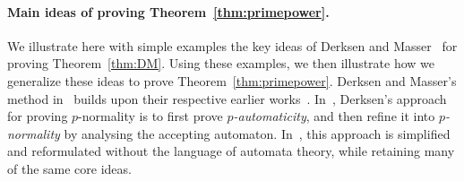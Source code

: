 \documentclass[letterpaper, 11pt, thm-restate]{article}
\numberwithin{equation}{section}
\theoremstyle{definition}
\theoremstyle{definition}
\theoremstyle{definition}
\begin{document}
\paragraph*{Main ideas of proving Theorem~\ref{thm:primepower}.}
We illustrate here with simple examples the key ideas of Derksen and Masser~\cite{derksen2012linear} %
for proving Theorem~\ref{thm:DM}.
Using these examples, we then illustrate how we generalize these ideas to prove Theorem~\ref{thm:primepower}.
Derksen and Masser's method in~\cite{derksen2012linear} builds upon their respective earlier works~\cite{masser2004mixing, derksen2007skolem}.
In~\cite{derksen2007skolem}, Derksen's approach for proving $p$-normality is to first prove \emph{$p$-automaticity}, and then refine it into \emph{$p$-normality} by analysing the accepting automaton.
In~\cite{derksen2012linear}, this approach is simplified and reformulated without the language of automata theory, while retaining many of the same core ideas.
\end{document}
